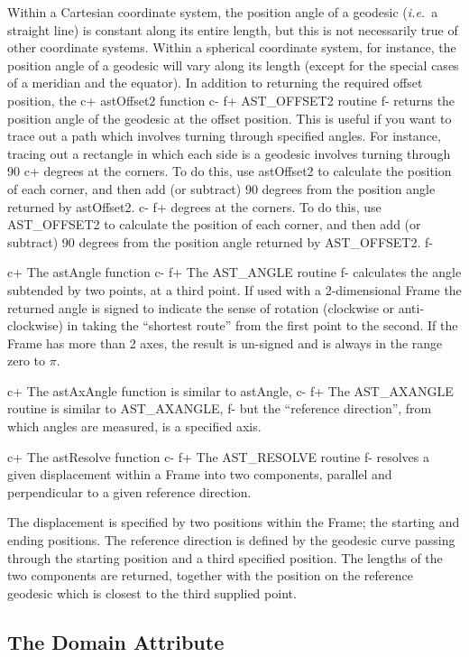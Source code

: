 \documentclass[twoside,11pt]{article}
\begin{document}
Within a Cartesian coordinate system, the position angle of a geodesic
({\em{i.e.}}\ a straight line) is constant along its entire length, but
this is not necessarily true of other coordinate systems. Within a
spherical coordinate system, for instance, the position angle of a geodesic
will vary along its length (except for the special cases of a meridian and
the equator). In addition to returning the required offset position, the
c+
astOffset2 function
c-
f+
AST\_OFFSET2 routine
f-
returns the position angle of the geodesic at the
offset position. This is useful if you want to trace out a path which
involves turning through specified angles. For instance, tracing out a
rectangle in which each side is a geodesic involves turning through 90
c+
degrees at the corners. To do this, use astOffset2 to calculate the
position of each corner, and then add (or subtract) 90 degrees from the
position angle returned by astOffset2.
c-
f+
degrees at the corners. To do this, use AST\_OFFSET2 to calculate the
position of each corner, and then add (or subtract) 90 degrees from the
position angle returned by AST\_OFFSET2.
f-

c+
The astAngle function
c-
f+
The AST\_ANGLE routine
f-
calculates the angle subtended by two points, at a third point.
If used with a 2-dimensional Frame the returned angle
is signed to indicate the sense of rotation (clockwise or anti-clockwise)
in taking the ``shortest route'' from the first point to the second.
If the Frame has more than 2 axes, the result is un-signed and is always
in the range zero to $\pi$.

c+
The astAxAngle function is similar to astAngle,
c-
f+
The AST\_AXANGLE routine is similar to AST\_AXANGLE,
f-
but the ``reference direction'', from which angles are measured, is
a specified axis.

c+
The astResolve function
c-
f+
The AST\_RESOLVE routine
f-
resolves a given displacement within a Frame into two components, parallel and
perpendicular to a given reference direction.

The displacement is specified by two positions within the Frame; the
starting and ending positions. The reference direction is defined by the
geodesic curve passing through the starting position and a third specified
position. The lengths of the two components are returned, together with
the position on the reference geodesic which is closest to the third
supplied point.

\subsection{\label{ss:framedomains}The Domain Attribute}
\end{document}

